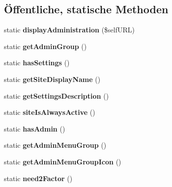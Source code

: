 \subsection*{Öffentliche, statische Methoden}
\begin{DoxyCompactItemize}
\item 
\mbox{\label{classadministrationasvimport_adb083a9b5cdc4110e5361cc4242efbb7}} 
static {\bfseries display\+Administration} (\$self\+U\+RL)
\item 
\mbox{\label{classadministrationasvimport_ae58738dde45581e585507e50fc4cc705}} 
static {\bfseries get\+Admin\+Group} ()
\item 
\mbox{\label{classadministrationasvimport_a7adb096c2625441f8d861ccbd3ad741f}} 
static {\bfseries has\+Settings} ()
\item 
\mbox{\label{classadministrationasvimport_a89fd0c97a790940209f265e108eb4067}} 
static {\bfseries get\+Site\+Display\+Name} ()
\item 
\mbox{\label{classadministrationasvimport_a523eb55173a3eb93cc193cb51cbe8232}} 
static {\bfseries get\+Settings\+Description} ()
\item 
\mbox{\label{classadministrationasvimport_a55b760bad066b9e962087894bd320f72}} 
static {\bfseries site\+Is\+Always\+Active} ()
\item 
\mbox{\label{classadministrationasvimport_a892c196aa4c50fb38e7bf65a8b81dbf0}} 
static {\bfseries has\+Admin} ()
\item 
\mbox{\label{classadministrationasvimport_ae75e6f0b729caf76e0083d926f9702b2}} 
static {\bfseries get\+Admin\+Menu\+Group} ()
\item 
\mbox{\label{classadministrationasvimport_a9bd080f9f91440619696501c0eb645ff}} 
static {\bfseries get\+Admin\+Menu\+Group\+Icon} ()
\item 
\mbox{\label{classadministrationasvimport_a80478f98c25f1cd7a8758ebf93892907}} 
static {\bfseries need2\+Factor} ()
\end{DoxyCompactItemize}
